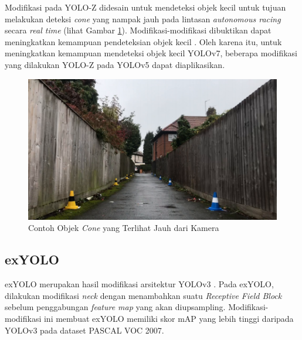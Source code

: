     Modifikasi pada YOLO-Z didesain untuk mendeteksi objek kecil untuk tujuan melakukan deteksi \emph{cone} yang nampak jauh pada lintasan \emph{autonomous racing} secara \emph{real time} (lihat Gambar \ref{fig:yolozcone}).
    Modifikasi-modifikasi dibuktikan dapat meningkatkan kemampuan pendeteksian objek kecil \parencite{yoloz}.
    Oleh karena itu, untuk meningkatkan kemampuan mendeteksi objek kecil YOLOv7, beberapa modifikasi yang dilakukan YOLO-Z pada YOLOv5 dapat diaplikasikan.
    \begin{figure}[ht]
      \centering
      \includegraphics[scale=0.4]{pictures/yoloz-cone.png}
      \caption{Contoh Objek \emph{Cone} yang Terlihat Jauh dari Kamera}
      \label{fig:yolozcone}
    \end{figure}

  \subsection{exYOLO}
    exYOLO merupakan hasil modifikasi arsitektur YOLOv3 \parencite{exyolo}.
    Pada exYOLO, dilakukan modifikasi \emph{neck} dengan menambahkan suatu \emph{Receptive Field Block} sebelum penggabungan \emph{feature map} yang akan diupsampling.
    Modifikasi-modifikasi ini membuat exYOLO memiliki skor mAP yang lebih tinggi daripada YOLOv3 pada dataset PASCAL VOC 2007.